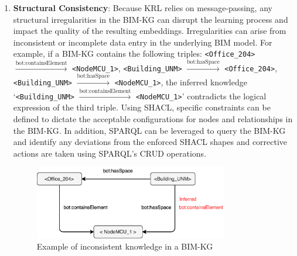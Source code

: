 \begin{enumerate}
    \item 
    \textbf{Structural Consistency}: Because \ac{KRL} relies on message-passing, any structural irregularities in the \ac{BIM-KG} can disrupt the learning process and impact the quality of the resulting embeddings. Irregularities can arise from inconsistent or incomplete data entry in the underlying \ac{BIM} model. For example, if a \ac{BIM-KG} contains the following triples: 
    \texttt{<Office\_204>} $\xrightarrow{\text{bot:containsElement}}$ \texttt{<NodeMCU\_1>}, 
    \texttt{<Building\_UNM>} $\xrightarrow{\text{bot:hasSpace}}$ \texttt{<Office\_204>}, \texttt{<Building\_UNM>} $\xrightarrow{\text{bot:hasSpace}}$ \texttt{<NodeMCU\_1>}, the inferred knowledge `\texttt{<Building\_UNM>} $\xrightarrow{\text{bot:containsElement}}$ \texttt{<NodeMCU\_1>}' contradicts the logical expression of the third triple. Using \ac{SHACL}, specific constraints can be defined to dictate the acceptable configurations for nodes and relationships in the \ac{BIM-KG}. In addition, \ac{SPARQL} can be leveraged to query the \ac{BIM-KG} and identify any deviations from the enforced \ac{SHACL} shapes and corrective actions are taken using \ac{SPARQL}'s \ac{CRUD} operations.

    \begin{figure}
        \centering
        \includegraphics[width=0.8\textwidth]{figures/inconsistent-kg.eps}
        \caption{Example of inconsistent knowledge in a \ac{BIM-KG}} \label{INCONSISTENT-KG}
    \end{figure}


\end{enumerate}
